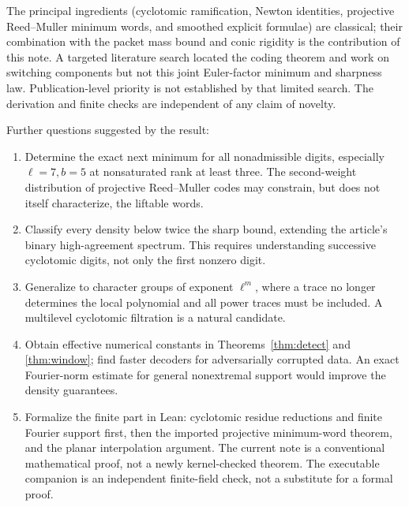 \documentclass[11pt]{article}
\theoremstyle{remark}\newtheorem{remark}[theorem]{Remark}
\begin{document}
The principal ingredients (cyclotomic ramification, Newton identities, projective Reed--Muller minimum words, and smoothed explicit formulae) are classical; their combination with the packet mass bound and conic rigidity is the contribution of this note. A targeted literature search located the coding theorem and work on switching components but not this joint Euler-factor minimum and sharpness law. Publication-level priority is not established by that limited search. The derivation and finite checks are independent of any claim of novelty.

Further questions suggested by the result:
\begin{enumerate}
\item Determine the exact next minimum for all nonadmissible digits, especially $\ell=7,b=5$ at nonsaturated rank at least three. The second-weight distribution of projective Reed--Muller codes may constrain, but does not itself characterize, the liftable words.
\item Classify every density below twice the sharp bound, extending the article's binary high-agreement spectrum. This requires understanding successive cyclotomic digits, not only the first nonzero digit.
\item Generalize to character groups of exponent $\ell^m$, where a trace no longer determines the local polynomial and all power traces must be included. A multilevel cyclotomic filtration is a natural candidate.
\item Obtain effective numerical constants in Theorems~\ref{thm:detect} and \ref{thm:window}; find faster decoders for adversarially corrupted data. An exact Fourier-norm estimate for general nonextremal support would improve the density guarantees.
\item Formalize the finite part in Lean: cyclotomic residue reductions and finite Fourier support first, then the imported projective minimum-word theorem, and the planar interpolation argument. The current note is a conventional mathematical proof, not a newly kernel-checked theorem. The executable companion is an independent finite-field check, not a substitute for a formal proof.
\end{enumerate}
\end{document}
